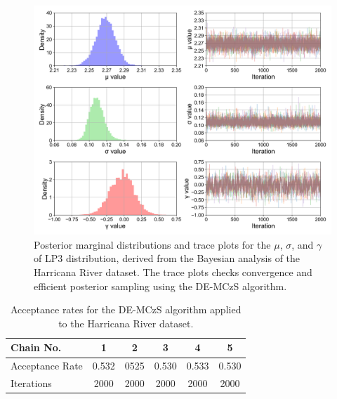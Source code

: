 \begin{figure}[ht!]
    \centering
    \includegraphics[width=1\linewidth]{_plots/HRA_posterior_combined_lp3.png}
    \caption{Posterior marginal distributions and trace plots for the $\mu$, $\sigma$, and $\gamma$ of LP3 distribution, derived from the Bayesian analysis of the Harricana River dataset. The trace plots checks convergence and efficient posterior sampling using the DE-MCzS algorithm.}
    \label{fig:HRA_posterior_combined_lp3}
\end{figure}

\renewcommand{\arraystretch}{1.2}

\renewcommand{\arraystretch}{1.2}
\begin{table}[H]
\centering
\caption{Acceptance rates for the DE-MCzS algorithm applied to the Harricana River dataset.}
\begin{tabular}{l c c c c c}
\hline
Chain No. &  1 & 2 & 3 & 4 & 5\\ \hline
Acceptance Rate & 0.532 & 0525 & 0.530 & 0.533 & 0.530\\
Iterations & 2000 & 2000 & 2000 & 2000 &2000 \\
\hline
\end{tabular}
\label{table:HRA_acceptance}
\end{table}

